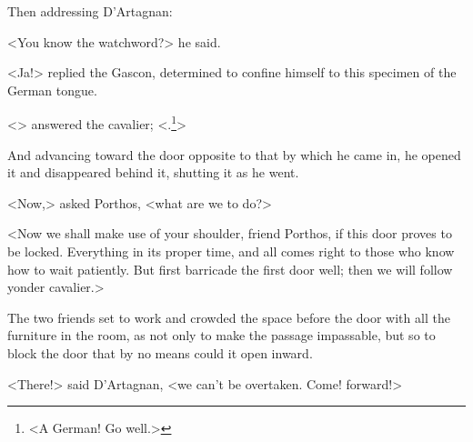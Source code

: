 Then addressing D'Artagnan:

<You know the watchword?> he said.

<Ja!> replied the Gascon, determined to confine himself to this specimen of the German tongue.

<> answered the cavalier; <.\footnote{<A German! Go well.>}>

And advancing toward the door opposite to that by which he came in, he opened it and disappeared behind it, shutting it as he went.

<Now,> asked Porthos, <what are we to do?>

<Now we shall make use of your shoulder, friend Porthos, if this door proves to be locked. Everything in its proper time, and all comes right to those who know how to wait patiently. But first barricade the first door well; then we will follow yonder cavalier.>

The two friends set to work and crowded the space before the door with all the furniture in the room, as not only to make the passage impassable, but so to block the door that by no means could it open inward.

<There!> said D'Artagnan, <we can't be overtaken. Come! forward!> 